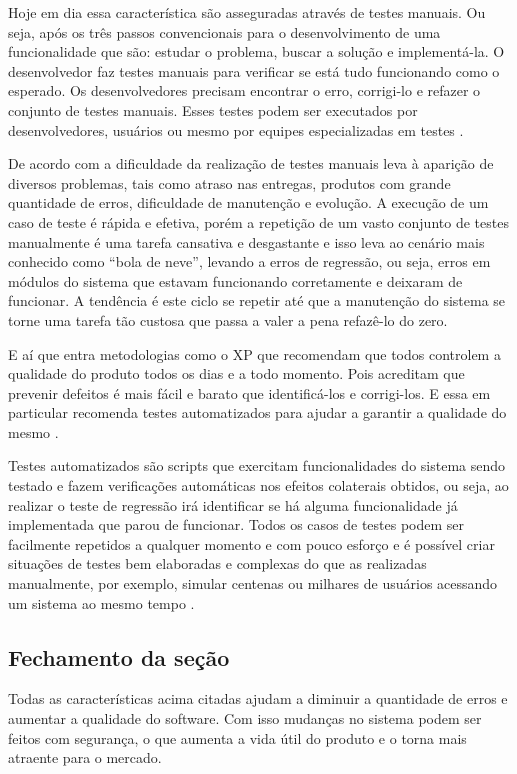 Hoje em dia essa característica são asseguradas através de testes manuais. Ou seja, após os três passos convencionais para o desenvolvimento de uma funcionalidade que são: estudar o problema, buscar a solução e implementá-la. O desenvolvedor faz testes manuais para verificar se está tudo funcionando como o esperado. Os desenvolvedores precisam encontrar o erro, corrigi-lo e refazer o conjunto de testes manuais. Esses testes podem ser executados por desenvolvedores, usuários ou mesmo por equipes especializadas em testes \cite{kon}.

De acordo com \cite{kon} a dificuldade da realização de testes manuais leva à aparição de diversos problemas, tais como atraso nas entregas, produtos com grande quantidade de erros, dificuldade de manutenção e evolução. A execução de um caso de teste é rápida e efetiva, porém a repetição de um vasto conjunto de testes manualmente é uma tarefa cansativa e desgastante e isso leva ao cenário mais conhecido como “bola de neve”, levando a erros de regressão, ou seja, erros em módulos do sistema que estavam funcionando corretamente e deixaram de funcionar. A tendência é este ciclo se repetir até que a manutenção do sistema se torne uma tarefa tão custosa que passa a valer a pena refazê-lo do zero.

E aí que entra metodologias como o XP que recomendam que todos controlem a qualidade do produto todos os dias e a todo momento. Pois acreditam que prevenir defeitos é mais fácil e barato que identificá-los e corrigi-los. E essa em particular recomenda testes automatizados para ajudar a garantir a qualidade do mesmo \cite{kon}.

Testes automatizados são scripts que exercitam funcionalidades do sistema sendo testado e fazem verificações automáticas nos efeitos colaterais obtidos, ou seja, ao realizar o teste de regressão irá identificar se há alguma funcionalidade já implementada que parou de funcionar. Todos os casos de testes podem ser facilmente repetidos a qualquer momento e com pouco esforço e é possível criar situações de testes bem elaboradas e complexas do que as realizadas manualmente, por exemplo, simular centenas ou milhares de usuários acessando um sistema ao mesmo tempo \cite{kon}.

\subsection{Fechamento da seção}

Todas as características acima citadas ajudam a diminuir a quantidade de erros e aumentar a qualidade do software. Com isso mudanças no sistema podem ser feitos com segurança, o que aumenta a vida útil do produto e o torna mais atraente para o mercado.
